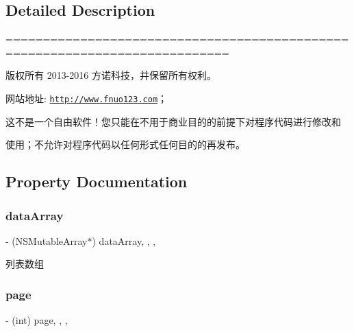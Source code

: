 \subsection{Detailed Description}
============================================================================

版权所有 2013-\/2016 方诺科技，并保留所有权利。

网站地址\+: \href{http://www.fnuo123.com}{\tt http\+://www.\+fnuo123.\+com}； 



这不是一个自由软件！您只能在不用于商业目的的前提下对程序代码进行修改和

使用；不允许对程序代码以任何形式任何目的的再发布。 

 

\subsection{Property Documentation}
\mbox{\label{category_order_list_view_controller_07_08_a03aba3ab777d91753302c8e254fc892d}} 
\subsubsection{\texorpdfstring{data\+Array}{dataArray}}
{\footnotesize\ttfamily -\/ (N\+S\+Mutable\+Array$\ast$) data\+Array\hspace{0.3cm}{\ttfamily [read]}, {\ttfamily [write]}, {\ttfamily [nonatomic]}, {\ttfamily [strong]}}

列表数组 \mbox{\label{category_order_list_view_controller_07_08_a8aa19081bfabd2c1c8755c76015669bf}} 
\subsubsection{\texorpdfstring{page}{page}}
{\footnotesize\ttfamily -\/ (int) page\hspace{0.3cm}{\ttfamily [read]}, {\ttfamily [write]}, {\ttfamily [nonatomic]}, {\ttfamily [assign]}}


